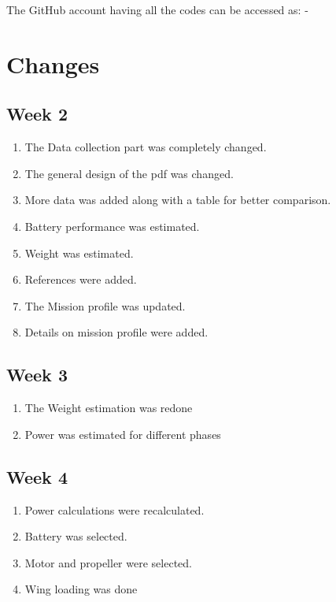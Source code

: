 \documentclass[12 pt]{article}
\begin{document}
{\vspace{10 pt}

The GitHub account having all the codes can be accessed as: - 

\href{https://github.com/abhijeetmangela/Group_7_design.git}{}



\section{Changes}

\subsection{Week 2}
\begin{enumerate}
    \item The Data collection part was completely changed.
    \item The general design of the pdf was changed.
    \item More data was added along with a table for better comparison.
    \item Battery performance was estimated.
    \item Weight was estimated.
    \item References were added.
    \item The Mission profile was updated.
    \item Details on mission profile were added.
\end{enumerate}

\subsection{Week 3}
\begin{enumerate}
    \item The Weight estimation was redone
    \item Power was estimated for different phases 
\end{enumerate}

\subsection{Week 4}
\begin{enumerate}
    \item Power calculations were recalculated.
    \item Battery was selected.
    \item Motor and propeller were selected.
    \item Wing loading was done
\end{enumerate}

}
\end{document}
